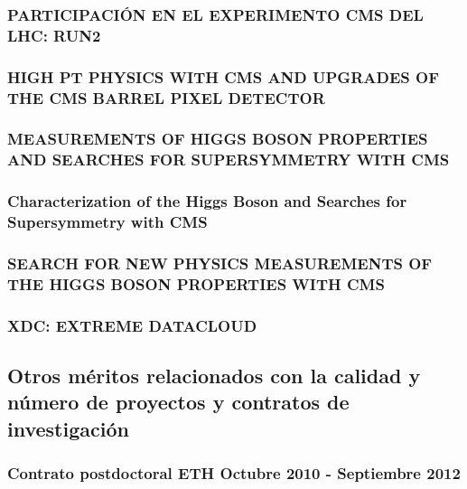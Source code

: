 \documentclass[a4paper, 11pt, twoside, openright]{report}
\begin{document}
\subsubsection{PARTICIPACIÓN EN EL EXPERIMENTO CMS DEL LHC: RUN2}


\subsubsection{HIGH PT PHYSICS WITH CMS AND UPGRADES OF THE CMS BARREL PIXEL DETECTOR}


\subsubsection{MEASUREMENTS OF HIGGS BOSON PROPERTIES AND SEARCHES FOR SUPERSYMMETRY WITH CMS}


\subsubsection{Characterization of the Higgs Boson and Searches for Supersymmetry with CMS}


\subsubsection{SEARCH FOR NEW PHYSICS MEASUREMENTS OF THE HIGGS BOSON PROPERTIES WITH CMS}


\subsubsection{XDC: EXTREME DATACLOUD}


\subsection{Otros méritos relacionados con la calidad y número de proyectos y contratos de investigación}

\subsubsection{Contrato postdoctoral ETH Octubre 2010 - Septiembre 2012}

\end{document}
